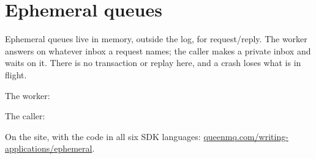 
\section{Ephemeral queues}

Ephemeral queues live in memory, outside the log, for request/reply. The worker answers on whatever
inbox a request names; the caller makes a private inbox and waits on it. There is no transaction or
replay here, and a crash loses what is in flight.

The worker:


The caller:




On the site, with the code in all six SDK languages: \href{https://queenmq.com/writing-applications/ephemeral/}{queenmq.com/writing-applications/ephemeral}.
